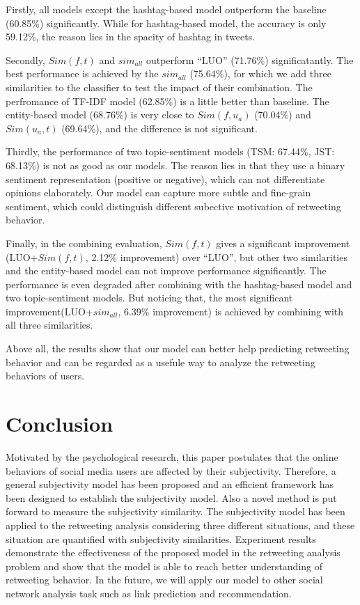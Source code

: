 \documentclass[letterpaper]{article}
\begin{document}
Firstly, all models except the hashtag-based model outperform the baseline (60.85\%) significantly. While for hashtag-based model, the accuracy is only 59.12\%, the reason lies in the spacity of hashtag in tweets. 

Secondly, $ Sim(f,t) $ and $ sim_{all}  $ outperform ``LUO'' (71.76\%) significatantly.
The best performance is achieved by the $ sim_{all}  $ (75.64\%), for which we add three similarities to the classifier to test the impact of their combination. 
The perfromance of TF-IDF model (62.85\%) is a little better than baseline. 
The entity-based model (68.76\%) is very close to  $ Sim(f,u_a)$ (70.04\%) and $ Sim(u_a,t)  $ (69.64\%), and the difference is not significant.

Thirdly, the performance of two topic-sentiment models (TSM: 67.44\%, JST: 68.13\%) is not as good as our models. The reason lies in that they use a binary sentiment representation (positive or negative), which can not differentiate opinions elaborately. Our model can capture more subtle and fine-grain sentiment, which could distinguish different subective motivation of retweeting behavior.

Finally, in the combining evaluation, $ Sim(f,t) $ gives a significant improvement (LUO+$ Sim(f,t) $, 2.12\% improvement) over ``LUO'', but other two similarities and the entity-based model can not improve performance significantly. The performance is even degraded after combining with the hashtag-based model and two topic-sentiment models. 
But noticing that, the most significant improvement(LUO+$ sim_{all}  $, 6.39\% improvement) is achieved by combining with all three similarities. 

Above all, the results show that our model can better help predicting retweeting behavior and can be regarded as a usefule way to analyze the retweeting behaviors of users. 

\section{Conclusion}
Motivated by the psychological research, this paper postulates that the online behaviors of social media users are affected by their subjectivity. Therefore, a general subjectivity model has been proposed and an efficient framework has been designed to establish the subjectivity model. Also a novel method is put forward to measure the subjectivity similarity. The subjectivity model has been applied to the retweeting analysis considering three different situations, and these situation are quantified with subjectivity similarities. 
Experiment results demonstrate the effectiveness of the proposed model in the retweeting analysis problem and show that the model is able to reach better understanding of retweeting behavior. 
In the future, we will apply our model to other social network analysis task such as link prediction and recommendation. 



\end{document}
